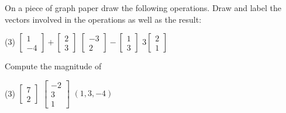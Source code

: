 \documentclass{ximera}
\begin{document}
\begin{exercise}
    On a piece of graph paper draw the following operations.  Draw and label the vectors involved in the operations as well as the result:
    \begin{tasks}(3)
        \task
        $\begin{bmatrix}
            1 \\
            -4
        \end{bmatrix}
        +
        \begin{bmatrix}
            2 \\
            3
        \end{bmatrix}$
        \task
        $\begin{bmatrix}
            -3 \\
            2
        \end{bmatrix}
        -
        \begin{bmatrix}
            1 \\
            3
        \end{bmatrix}$
        \task
        $3\begin{bmatrix}
            2 \\
            1
        \end{bmatrix}$
    \end{tasks}
\end{exercise}

\begin{exercise}
    Compute the magnitude of
    \begin{tasks}(3)
        \task
        $\begin{bmatrix}
            7 \\
            2 
        \end{bmatrix}$
        \task
        $\begin{bmatrix}
            -2 \\
            3 \\
            1
        \end{bmatrix}$
        \task $(1,3,-4)$
    \end{tasks}
\end{exercise}
\end{document}

